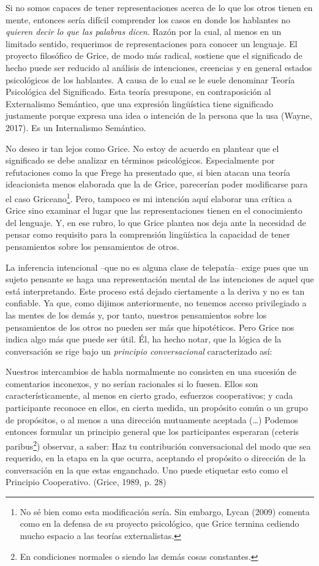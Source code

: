 \documentclass[]{book}
\begin{document}
Si no somos capaces de tener representaciones acerca de lo que los otros
tienen en mente, entonces sería difícil comprender los casos en donde
los hablantes no \emph{quieren decir lo que las palabras dicen}. Razón
por la cual, al menos en un limitado sentido, requerimos de
representaciones para conocer un lenguaje. El proyecto filosófico de
Grice, de modo más radical, sostiene que el significado de hecho puede
ser reducido al análisis de intenciones, creencias y en general estados
psicológicos de los hablantes. A causa de lo cual se le suele denominar
Teoría Psicológica del Significado. Esta teoría presupone, en
contraposición al Externalismo Semántico, que una expresión lingüística
tiene significado justamente porque expresa una idea o intención de la
persona que la usa (Wayne, 2017). Es un Internalismo Semántico.

No deseo ir tan lejos como Grice. No estoy de acuerdo en plantear que el
significado se debe analizar en términos psicológicos. Especialmente por
refutaciones como la que Frege ha presentado que, si bien atacan una
teoría ideacionista menos elaborada que la de Grice, parecerían poder
modificarse para el caso Griceano\footnote{No sé bien como esta
  modificación sería. Sin embargo, Lycan (2009) comenta como en la
  defensa de su proyecto psicológico, que Grice termina cediendo mucho
  espacio a las teorías externalistas.}. Pero, tampoco es mi intención
aquí elaborar una crítica a Grice sino examinar el lugar que las
representaciones tienen en el conocimiento del lenguaje. Y, en ese
rubro, lo que Grice plantea nos deja ante la necesidad de pensar como
requisito para la comprensión lingüística la capacidad de tener
pensamientos sobre los pensamientos de otros.

La inferencia intencional --que no es alguna clase de telepatía-- exige
pues que un sujeto pensante se haga una representación mental de las
intenciones de aquel que está interpretando. Este proceso está dejado
ciertamente a la deriva y no es tan confiable. Ya que, como dijimos
anteriormente, no tenemos acceso privilegiado a las mentes de los demás
y, por tanto, nuestros pensamientos sobre los pensamientos de los otros
no pueden ser más que hipotéticos. Pero Grice nos indica algo más que
puede ser útil. Él, ha hecho notar, que la lógica de la conversación se
rige bajo un \emph{principio conversacional} caracterizado así:

Nuestros intercambios de habla normalmente no consisten en una sucesión
de comentarios inconexos, y no serían racionales si lo fuesen. Ellos son
característicamente, al menos en cierto grado, esfuerzos cooperativos; y
cada participante reconoce en ellos, en cierta medida, un propósito
común o un grupo de propósitos, o al menos a una dirección mutuamente
aceptada (\ldots{}) Podemos entonces formular un principio general que
los participantes esperaran (ceteris paribus\footnote{En condiciones
  normales o siendo las demás cosas constantes.}) observar, a saber: Haz
tu contribución conversacional del modo que sea requerido, en la etapa
en la que ocurra, aceptando el propósito o dirección de la conversación
en la que estas enganchado. Uno puede etiquetar esto como el Principio
Cooperativo. (Grice, 1989, p. 28)
\end{document}
